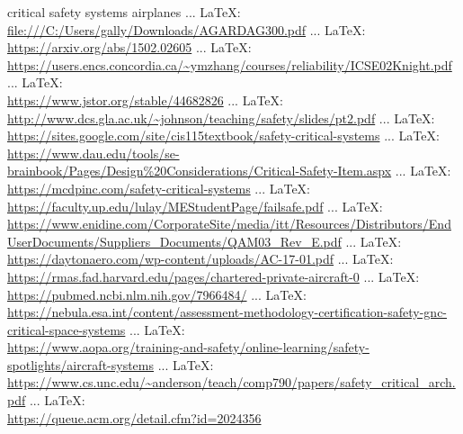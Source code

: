 \begin{thebibliography}{99}
{{%
critical safety systems airplanes
 ... \LaTeX:\\ \url{file:///C:/Users/gally/Downloads/AGARDAG300.pdf}
 ... \LaTeX:\\ \url{https://arxiv.org/abs/1502.02605}
 ... \LaTeX:\\ \url{https://users.encs.concordia.ca/~ymzhang/courses/reliability/ICSE02Knight.pdf}
 ... \LaTeX:\\ \url{https://www.jstor.org/stable/44682826}
 ... \LaTeX:\\ \url{http://www.dcs.gla.ac.uk/~johnson/teaching/safety/slides/pt2.pdf}
 ... \LaTeX:\\ \url{https://sites.google.com/site/cis115textbook/safety-critical-systems}
 ... \LaTeX:\\ \url{https://www.dau.edu/tools/se-brainbook/Pages/Design%20Considerations/Critical-Safety-Item.aspx}
 ... \LaTeX:\\ \url{https://mcdpinc.com/safety-critical-systems}
 ... \LaTeX:\\ \url{https://faculty.up.edu/lulay/MEStudentPage/failsafe.pdf}
 ... \LaTeX:\\ \url{https://www.enidine.com/CorporateSite/media/itt/Resources/Distributors/EndUserDocuments/Suppliers_Documents/QAM03_Rev_E.pdf}
 ... \LaTeX:\\ \url{https://daytonaero.com/wp-content/uploads/AC-17-01.pdf}
 ... \LaTeX:\\ \url{https://rmas.fad.harvard.edu/pages/chartered-private-aircraft-0}
 ... \LaTeX:\\ \url{https://pubmed.ncbi.nlm.nih.gov/7966484/}
 ... \LaTeX:\\ \url{https://nebula.esa.int/content/assessment-methodology-certification-safety-gnc-critical-space-systems}
 ... \LaTeX:\\ \url{https://www.aopa.org/training-and-safety/online-learning/safety-spotlights/aircraft-systems}
 ... \LaTeX:\\ \url{https://www.cs.unc.edu/~anderson/teach/comp790/papers/safety_critical_arch.pdf}
 ... \LaTeX:\\ \url{https://queue.acm.org/detail.cfm?id=2024356}
}}
\end{thebibliography}

